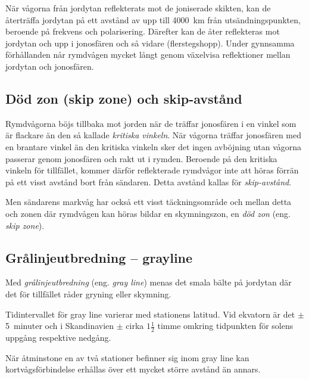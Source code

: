 
När vågorna från jordytan reflekterats mot de joniserade skikten, kan
de återträffa jordytan på ett avstånd av upp till \SI{4000}{\kilo\metre} från
utsändningspunkten, beroende på frekvens och polarisering.
Därefter kan de åter reflekteras mot jordytan och upp i jonosfären
och så vidare (flerstegshopp).
Under gynnsamma förhållanden når rymdvågen mycket långt genom växelvisa
reflektioner mellan jordytan och jonosfären.

\subsection{Död zon (skip zone) och skip-avstånd}

Rymdvågorna böjs tillbaka mot jorden när de träffar jonosfären i en
vinkel som är flackare än den så kallade \emph{kritiska vinkeln}.
När vågorna träffar jonosfären med en brantare vinkel än den kritiska vinkeln
sker det ingen avböjning utan vågorna passerar genom jonosfären och rakt ut
i rymden.
Beroende på den kritiska vinkeln för tillfället, kommer därför reflekterade
rymdvågor inte att höras förrän på ett visst avstånd bort från sändaren.
Detta avstånd kallas för \emph{skip-avstånd}.

Men sändarens markvåg har också ett visst täckningsområde och mellan
detta och zonen där rymdvågen kan höras bildar en skymningszon, en
\emph{död zon} (eng. \emph{skip zone}).

\subsection{Grålinjeutbredning -- grayline}

Med \emph{grålinjeutbredning} (eng. \emph{gray line}) menas det smala bälte på
jordytan där det för tillfället råder gryning eller skymning.

Tidintervallet för gray line varierar med stationens latitud.
Vid ekvatorn är det \(\pm\) 5~minuter och i Skandinavien \(\pm\) cirka
\(1\frac{1}{2}\) timme omkring tidpunkten för solens uppgång
respektive nedgång.

När åtminstone en av två stationer befinner sig inom gray line kan
kortvågsförbindelse erhållas över ett mycket större avstånd än annars.

